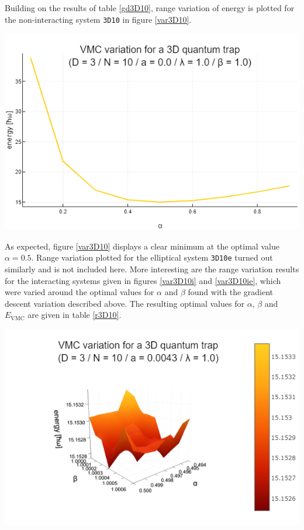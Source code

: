 \documentclass[a4paper,8pt]{article}
\begin{document}
\begin{multicols}{2}
Building on the results of table \ref{gd3D10}, range variation of energy is plotted for the non-interacting system \texttt{3D10} in figure \ref{var3D10}.

\begin{center}
\includegraphics[width=0.9\columnwidth]{fig3D10_variation}
\label{var3D10}
\end{center}

As expected, figure \ref{var3D10} displays a clear minimum at the optimal value $\alpha = 0.5$. Range variation plotted for the elliptical system \texttt{3D10e} turned out similarly and is not included here. More interesting are the range variation results for the interacting systems given in figures \ref{var3D10i} and \ref{var3D10ie}, which were varied around the optimal values for $\alpha$ and $\beta$ found with the gradient descent variation described above. The resulting optimal values for $\alpha$, $\beta$ and $E_\text{VMC}$ are given in table \ref{r3D10}.

\begin{center}
\includegraphics[width=0.9\columnwidth]{fig3D10i_variation}
\label{var3D10i}
\end{center}


\end{multicols}
\end{document}

